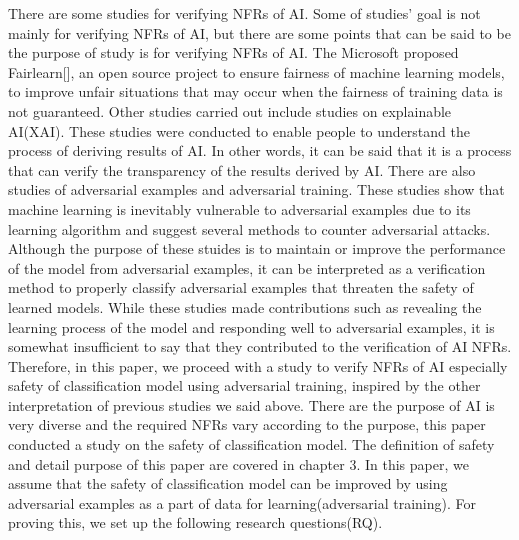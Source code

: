 \documentclass[journal,article,submit,moreauthors,pdftex]{Definitions/mdpi}
\begin{document}
There are some studies for verifying NFRs of AI. Some of studies' goal is not mainly for verifying NFRs of AI, but there are some points that can be said to be the purpose of study is for verifying NFRs of AI.
The Microsoft proposed Fairlearn[], an open source project to ensure fairness of machine learning models, to improve unfair situations that may occur when the fairness of training data is not guaranteed.
Other studies carried out include studies on explainable AI(XAI). These studies were conducted to enable people to understand the process of deriving results of AI. In other words, it can be said that it is a process that can verify the transparency of the results derived by AI.
There are also studies of adversarial examples and adversarial training. These studies show that machine learning is inevitably vulnerable to adversarial examples due to its learning algorithm and suggest several methods to counter adversarial attacks.
Although the purpose of these stuides is to maintain or improve the performance of the model from adversarial examples, it can be interpreted as a verification method to properly classify adversarial examples that threaten the safety of learned models.
While these studies made contributions such as revealing the learning process of the model and responding well to adversarial examples, it is somewhat insufficient to say that they contributed to the verification of AI NFRs.
Therefore, in this paper, we proceed with a study to verify NFRs of AI especially safety of classification model using adversarial training, inspired by the other interpretation of previous studies we said above.
There are the purpose of AI is very diverse and the required NFRs vary according to the purpose, this paper conducted a study on the safety of classification model. The definition of safety and detail purpose of this paper are covered in chapter 3.
In this paper, we assume that the safety of classification model can be improved by using adversarial examples as a part of data for learning(adversarial training).
For proving this, we set up the following research questions(RQ).
\end{document}
